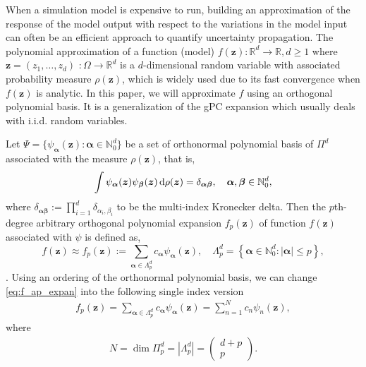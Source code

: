 When a simulation model is expensive to run, building an approximation of the response of the model output with respect to the variations in the model input can often be an efficient approach to quantify uncertainty propagation.
The polynomial approximation of a function (model) $f(\bm{z}): \mathbb{R}^d\rightarrow\mathbb{R}, d\geq1$ 
where $\bm{z}= (z_1, \dots, z_d)$ $:\Omega\rightarrow \mathbb{R}^d$ is a $d$-dimensional random variable 
with associated probability measure $\rho(\bm{z})$, which is widely used due to its fast convergence when $f(\bm{z})$ is analytic.
In this paper, we will approximate $f$ using an orthogonal polynomial basis.
It is a generalization of the gPC expansion which usually deals with i.i.d. random variables. 

Let $\Psi = \{\psi_{\bm{\alpha}}(\bm{z}):\bm{\alpha}\in \mathbb{N}_0^d\}$ be a set of orthonormal polynomial basis of $\Pi^d$ associated with the measure $\rho(\bm{z})$, that is,
\begin{align}\label{eq:orthogonal}
    \int\psi_{\bm{\alpha}}(\bm{z})\psi_{\bm{\beta}} (\bm{z})\,\mathrm{d} \rho(\bm{z})=\delta_{\bm{\alpha}\bm{\beta}}, \quad \bm{\alpha},\bm{\beta}\in \mathbb{N}_0^d,
\end{align}
where $\delta_{\bm{\alpha\beta}} := \prod_{i=1}^d \delta_{\alpha_i,\beta_i}$ to be the multi-index Kronecker delta.
Then the $p$th-degree arbitrary orthogonal polynomial expansion $f_p(\bm{z})$ of function $f(\bm{z})$ associated with $\psi$ is defined as,
\begin{equation}\label{eq:f_ap_expan}
    f(\bm{z}) \approx f_p(\bm{z}) := \sum_{\bm{\alpha} \in \Lambda^d_{p}} c_{\bm{\alpha}}\psi_{\bm{\alpha}}(\bm{z}),\quad \Lambda^d_{p}= \left\{\bm{\alpha}\in \mathbb{N}_0^d : |\bm{\alpha}| \leq p \right\},
\end{equation}
. Using an ordering of the orthonormal 
polynomial basis, we can change \eqref{eq:f_ap_expan} into the following single index version
\begin{align} \label{eq:ape_single}
    f_p(\bm{z})=\sum_{\bm{\alpha}\in \Lambda^d_{p}}c_{\bm{\alpha}}\psi_{\bm{\alpha}}(\bm{z})=\sum_{n=1}^{N}{c}_n \psi_n(\bm{z}),
\end{align}
where 
\begin{align*}
    N = \dim \Pi_p^d =  |\Lambda^d_{p}| = \left( \begin{array}{c} d+p \\ p\end{array}\right).
\end{align*}

